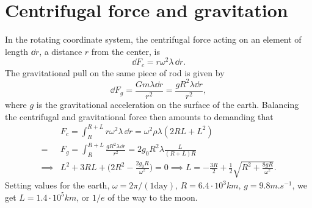 \documentclass{article}
\begin{document}
    \section{Centrifugal force and gravitation}
    In the rotating coordinate system, the centrifugal force acting on an element of length $\dd r$, a distance $r$ from the center, is
    \begin{equation*}
        \dd F_c = r \omega^2 \lambda \, \dd r.
    \end{equation*}
    The gravitational pull on the same piece of rod is given by 
    \begin{equation*}
        \dd F_g = \frac{G m \lambda \dd r}{r^2} = \frac{g R^2 \lambda \dd r}{r^2},
    \end{equation*}
    where $g$ is the gravitational acceleration on the surface of the earth. Balancing the centrifugal and gravitational force then amounts to demanding that
    \begin{align}
        & F_c = \int_{R}^{R + L} r \omega^2 \lambda \, \dd r = \omega^2 \rho \lambda (2RL + L^2) \\ 
        = & F_g = \int_{R}^{R + L} \frac{g R^2 \lambda \dd r}{r^2} = 2g_0 R^2 \lambda \frac{L}{(R + L)R} \\
        \implies &L^2 + 3RL  + \bigg(2R^2- \frac{2g_0 R }{\omega^2 } \bigg) = 0 \implies L = -\frac{3 R}{2} + \frac{1}{2}\sqrt{R^2 + \frac{8 g R }{\omega^2 }}.
    \end{align}
    Setting values for the earth, $\omega  = 2 \pi /(1 \mathrm{day}), \, R = 6.4 \cdot 10^3 \si{km}, \, g = 9.8 \si{m.s^{-1}}$, we get $L = 1.4 \cdot 10^5 \si{km}$, or $1/e$ of the way to the moon.
\end{document}
